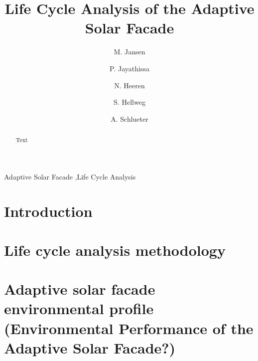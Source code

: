 \documentclass[preprint,12pt]{elsarticle}
\begin{document}
\begin{frontmatter}

\title{Life Cycle Analysis of the Adaptive Solar Facade} 

\author[ita]{M. Jansen}

\author[ita]{P. Jayathissa}

\author[baug]{N. Heeren}

\author[baug]{S. Hellweg}

\author[ita]{A. Schlueter}



\address[ita]{Architecture and Building Systems, Institute of Technology in Architecture,\\ ETH Zurich, Switzerland} 
\address[baug]{Ecological System Design, Institute of Environmental Engineering,\\ ETH Zurich, Switzerland}

\begin{abstract}
Text 
\end{abstract}

\begin{keyword}
Adaptive Solar Facade \sep Life Cycle Analysis
\end{keyword}

\end{frontmatter}

\section{Introduction}
\label{introduction}


\section{Life cycle analysis methodology}
\label{method}


\section{Adaptive solar facade environmental profile (Environmental Performance of the Adaptive Solar Facade?)}
\label{profile}

\end{document}
